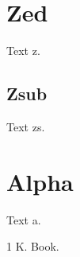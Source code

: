 \documentclass{article}
\begin{document}
\tableofcontents
\section{Zed}\label{split_label_collides_with_root_red} Text z.
\subsection{Zsub}\label{zs} Text zs.
\section{Alpha}\label{a} Text a.
\begin{thebibliography}{1} K. Book.\end{thebibliography}
\end{document}
